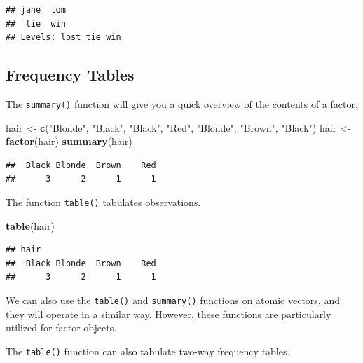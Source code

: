 \documentclass[
]{book}
\newenvironment{Shaded}{\begin{snugshade}}{\end{snugshade}}
\newcommand{\KeywordTok}[1]{\textcolor[rgb]{0.13,0.29,0.53}{\textbf{#1}}}
\newcommand{\NormalTok}[1]{#1}
\newcommand{\StringTok}[1]{\textcolor[rgb]{0.31,0.60,0.02}{#1}}
\begin{document}
\begin{verbatim}
## jane  tom 
##  tie  win 
## Levels: lost tie win
\end{verbatim}

\hypertarget{frequency-tables}{%
\subsection{Frequency Tables}\label{frequency-tables}}

The \texttt{summary()} function will give you a quick overview of the contents of a factor.

\begin{Shaded}
\begin{Highlighting}[]
\NormalTok{hair <-}\StringTok{ }\KeywordTok{c}\NormalTok{(}\StringTok{"Blonde"}\NormalTok{, }\StringTok{"Black"}\NormalTok{, }\StringTok{"Black"}\NormalTok{, }\StringTok{"Red"}\NormalTok{, }\StringTok{"Blonde"}\NormalTok{, }\StringTok{"Brown"}\NormalTok{,}
    \StringTok{"Black"}\NormalTok{)}
\NormalTok{hair <-}\StringTok{ }\KeywordTok{factor}\NormalTok{(hair)}
\KeywordTok{summary}\NormalTok{(hair)}
\end{Highlighting}
\end{Shaded}

\begin{verbatim}
##  Black Blonde  Brown    Red 
##      3      2      1      1
\end{verbatim}

The function \texttt{table()} tabulates observations.

\begin{Shaded}
\begin{Highlighting}[]
\KeywordTok{table}\NormalTok{(hair)}
\end{Highlighting}
\end{Shaded}

\begin{verbatim}
## hair
##  Black Blonde  Brown    Red 
##      3      2      1      1
\end{verbatim}

We can also use the \texttt{table()} and \texttt{summary()} functions on atomic vectors, and they will operate in a similar way. However, these functions are particularly utilized for factor objects.

The \texttt{table()} function can also tabulate two-way frequency tables.
\end{document}
